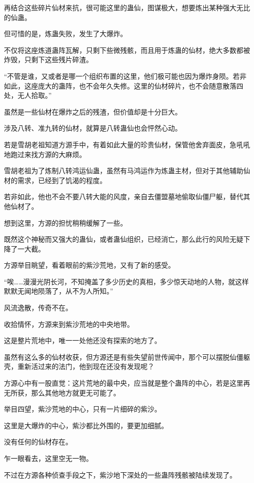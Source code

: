 \begin{this_body}
再结合这些碎片仙材来抗，很可能这里的蛊仙，图谋极大，想要炼出某种强大无比的仙蛊。

但可惜的是，炼蛊失败，发生了大爆炸。

不仅将这座炼道蛊阵瓦解，只剩下些微残骸，而且用于炼蛊的仙材，绝大多数都被炸毁，只剩下这些残片碎渣。

“不管是谁，又或者是哪一个组织布置的这里，他们极可能也因为爆炸身陨。若非如此，这座庞大的蛊阵，也不会年久失修。这里的仙材碎片，也不会随意散落四处，无人拾取。”

虽然是一些仙材在爆炸之后的残渣，但价值却是十分巨大。

涉及八转、准九转的仙材，就算是八转蛊仙也会怦然心动。

若是雪胡老祖知道方源手中，有着如此大量的珍贵仙材，保管他舍弃面皮，急吼吼地跑过来找方源的大麻烦。

雪胡老祖为了炼制八转鸿运仙蛊，虽然有马鸿运作为炼蛊主材，但对于其他辅助仙材的需求，已经到了饥渴的程度。

若非如此，他也不会不要八转大能的风度，亲自去僵盟墓地偷取仙僵尸躯，替代其他仙材了。

想到这里，方源的担忧稍稍缓解了一些。

既然这个神秘而又强大的蛊仙，或者蛊仙组织，已经消亡，那么此行的风险无疑下降了一大截。

方源举目眺望，看着眼前的紫沙荒地，又有了新的感受。

“唉……漫漫光阴长河，不知掩盖了多少历史的真相，多少惊天动地的人物，就这样默默无闻地陨落了，从不为人所知。”

风流逸散，传奇不在。

收拾情怀，方源来到紫沙荒地的中央地带。

这是整片荒地中，唯一一处他还没有探索的地方了。

虽然有这么多的仙材收获，但方源还是有些失望前世传闻中，那个可以摆脱仙僵躯壳，重新活过来的法门，他到现在还没有发现呢？

方源心中有一股直觉：这片荒地的最中央，应当就是整个蛊阵的中心，若是这里再无所获，那么其他地方就更无可能了。

举目四望，紫沙荒地的中心，只有一片细碎的紫沙。

这里是大爆炸的中心，紫沙都比外围的，要更加细腻。

没有任何的仙材存在。

乍一眼看去，这里空无一物。

不过在方源各种侦查手段之下，紫沙地下深处的一些蛊阵残骸被陆续发现了。


\end{this_body}
